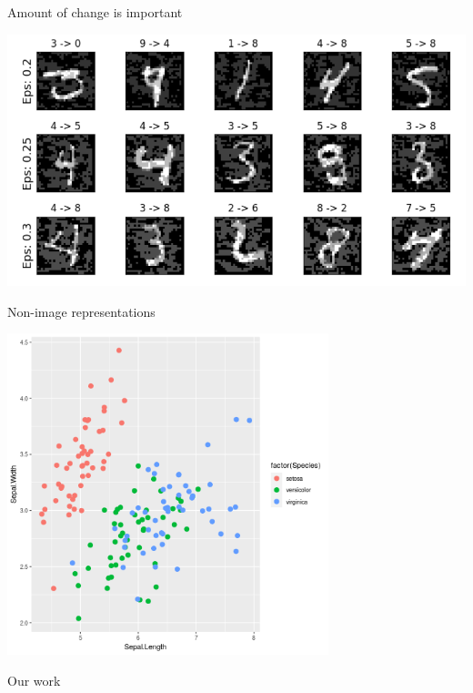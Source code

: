 \documentclass[smaller]{beamer}
\begin{document}
\begin{frame}[label={sec:org4a7a1a8}]{Amount of change is important}
\begin{center}
\includegraphics[width=.9\linewidth]{images/eos.png}
\end{center}
\end{frame}

\begin{frame}[label={sec:org7be48c1}]{Non-image representations}
\begin{center}
\includegraphics[width=0.7\textwidth]{images/iris.png}
\end{center}
\end{frame}

\begin{frame}[label={sec:orga438773},plain,c]{}
\begin{center}
\vspace{1em}\Huge Our work
\end{center}
\end{frame}
\end{document}
